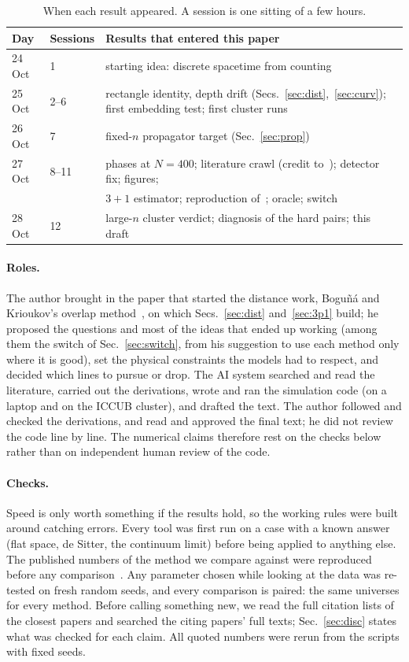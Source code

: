 \documentclass[11pt,a4paper]{article}
\begin{document}
\begin{table}[h]
\centering\small
\begin{tabular}{@{}lll@{}}
\toprule
Day & Sessions & Results that entered this paper \\
\midrule
24 Oct & 1 & starting idea: discrete spacetime from counting \\
25 Oct & 2--6 & rectangle identity, depth drift (Secs.~\ref{sec:dist},~\ref{sec:curv}); first embedding test; first cluster runs \\
26 Oct & 7 & fixed-$n$ propagator target (Sec.~\ref{sec:prop}) \\
27 Oct & 8--11 & phases at $N=400$; literature crawl (credit to~\cite{CloughEvans16}); detector fix; figures; \\
 & & $3+1$ estimator; reproduction of~\cite{Johnston25}; oracle; switch \\
28 Oct & 12 & large-$n$ cluster verdict; diagnosis of the hard pairs; this draft \\
\bottomrule
\end{tabular}
\caption{When each result appeared. A session is one sitting of a few hours.}\label{tab:timeline}
\end{table}

\paragraph{Roles.} The author brought in the paper that started the distance work, Bogu\~n\'a and Krioukov's overlap method~\cite{BK24}, on which Secs.~\ref{sec:dist} and~\ref{sec:3p1} build; he proposed the questions and most of the ideas that ended up working (among them the switch of Sec.~\ref{sec:switch}, from his suggestion to use each method only where it is good), set the physical constraints the models had to respect, and decided which lines to pursue or drop. The AI system searched and read the literature, carried out the derivations, wrote and ran the simulation code (on a laptop and on the ICCUB cluster), and drafted the text. The author followed and checked the derivations, and read and approved the final text; he did not review the code line by line. The numerical claims therefore rest on the checks below rather than on independent human review of the code.

\paragraph{Checks.} Speed is only worth something if the results hold, so the working rules were built around catching errors. Every tool was first run on a case with a known answer (flat space, de Sitter, the continuum limit) before being applied to anything else. The published numbers of the method we compare against were reproduced before any comparison~\cite{Johnston25}. Any parameter chosen while looking at the data was re-tested on fresh random seeds, and every comparison is paired: the same universes for every method. Before calling something new, we read the full citation lists of the closest papers and searched the citing papers' full texts; Sec.~\ref{sec:disc} states what was checked for each claim. All quoted numbers were rerun from the scripts with fixed seeds.
\end{document}
